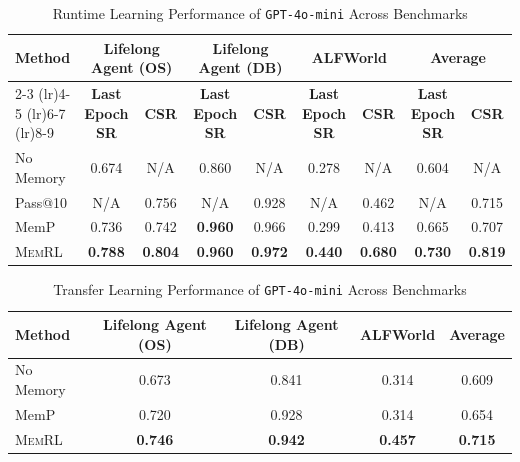 \documentclass{article}
\theoremstyle{plain}
\theoremstyle{definition}
\theoremstyle{remark}
\begin{document}
\begin{table}[htbp] %
\centering
\caption{Runtime Learning Performance of \texttt{GPT-4o-mini} Across Benchmarks}
\label{tab:runtime_learning_gpt4omini}
\begin{tabular}{lcccccccc}
\toprule
\multirow{2}{*}{\textbf{Method}} & \multicolumn{2}{c}{\textbf{Lifelong Agent (OS)}} & \multicolumn{2}{c}{\textbf{Lifelong Agent (DB)}} & \multicolumn{2}{c}{\textbf{ALFWorld}} & \multicolumn{2}{c}{\textbf{Average}} \\
\cmidrule(lr){2-3} \cmidrule(lr){4-5} \cmidrule(lr){6-7} \cmidrule(lr){8-9}
& \textbf{Last Epoch SR} & \textbf{CSR} & \textbf{Last Epoch SR} & \textbf{CSR} & \textbf{Last Epoch SR} & \textbf{CSR} & \textbf{Last Epoch SR} & \textbf{CSR} \\
\midrule
No Memory & 0.674 & N/A & 0.860 & N/A & 0.278 & N/A & 0.604 & N/A \\ 
Pass@10   & N/A   & 0.756 & N/A   & 0.928 & N/A & 0.462 & N/A  & 0.715 \\ 
MemP      & 0.736 & 0.742 & \textbf{0.960} & 0.966 & 0.299 & 0.413 & 0.665 & 0.707 \\
\textsc{MemRL}     & \textbf{0.788} & \textbf{0.804} & \textbf{0.960} & \textbf{0.972} & \textbf{0.440} & \textbf{0.680} & \textbf{0.730} & \textbf{0.819} \\ 
\bottomrule
\end{tabular}
\end{table}

\begin{table}[htbp]
\centering
\caption{Transfer Learning Performance of \texttt{GPT-4o-mini} Across Benchmarks}
\label{tab:transfer_learning_gpt4omini}
\begin{tabular}{lcccc}
\toprule
\textbf{Method} & \textbf{Lifelong Agent (OS)} & \textbf{Lifelong Agent (DB)} & \textbf{ALFWorld} & \textbf{Average} \\
\midrule
No Memory & 0.673 & 0.841 & 0.314 & 0.609 \\
MemP      & 0.720 & 0.928 & 0.314 & 0.654 \\
\textsc{MemRL}     & \textbf{0.746} & \textbf{0.942} & \textbf{0.457} & \textbf{0.715} \\
\bottomrule
\end{tabular}
\end{table}
\end{document}
